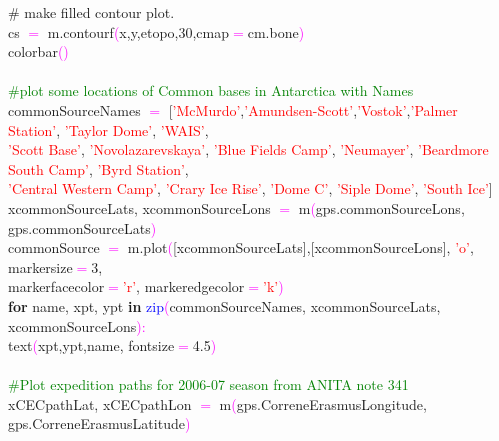 {\indent \# make filled contour plot. \\
\indent cs \textcolor{magenta}{$=$} m.contourf\textcolor{magenta}{(}x,y,etopo,30,cmap\textcolor{magenta}{$=$}cm.bone\textcolor{magenta}{)} \\
\indent colorbar\textcolor{magenta}{(}\textcolor{magenta}{)} \\
\\
\indent \textcolor{green}{\#plot some locations of Common bases in Antarctica with Names} \\
\indent commonSourceNames \textcolor{magenta}{$=$}  [\textcolor{red}{'McMurdo'},\textcolor{red}{'Amundsen-Scott'},\textcolor{red}{'Vostok'},\textcolor{red}{'Palmer Station'}, \textcolor{red}{'Taylor Dome'}, \textcolor{red}{'WAIS'}, \\ \indent \textcolor{red}{'Scott Base'}, \textcolor{red}{'Novolazarevskaya'}, \textcolor{red}{'Blue Fields Camp'}, \textcolor{red}{'Neumayer'}, \textcolor{red}{'Beardmore South Camp'}, \textcolor{red}{'Byrd Station'}, \\ \indent \textcolor{red}{'Central Western Camp'}, \textcolor{red}{'Crary Ice Rise'}, \textcolor{red}{'Dome C'}, \textcolor{red}{'Siple Dome'}, \textcolor{red}{'South Ice'}] \\
\indent xcommonSourceLats, xcommonSourceLons \textcolor{magenta}{$=$} m\textcolor{magenta}{(}gps.commonSourceLons, gps.commonSourceLats\textcolor{magenta}{)} \\
\indent commonSource \textcolor{magenta}{$=$} m.plot\textcolor{magenta}{(}[xcommonSourceLats],[xcommonSourceLons], \textcolor{red}{'o'}, markersize\textcolor{magenta}{$=$}3, \\ \indent markerfacecolor\textcolor{magenta}{$=$}\textcolor{red}{'r'}, markeredgecolor\textcolor{magenta}{$=$}\textcolor{red}{'k'}\textcolor{magenta}{)} \\
\indent \textbf{for} name, xpt, ypt \textbf{in} \textcolor{blue}{zip}\textcolor{magenta}{(}commonSourceNames, xcommonSourceLats, xcommonSourceLons\textcolor{magenta}{)}\textcolor{magenta}{:} \\
\indent \indent text\textcolor{magenta}{(}xpt,ypt,name, fontsize\textcolor{magenta}{$=$}4.5\textcolor{magenta}{)} \\
\\
\indent \textcolor{green}{\#Plot expedition paths for 2006-07 season from ANITA note 341} \\
\indent xCECpathLat, xCECpathLon \textcolor{magenta}{$=$} m\textcolor{magenta}{(}gps.CorreneErasmusLongitude, gps.CorreneErasmusLatitude\textcolor{magenta}{)} \\
}
